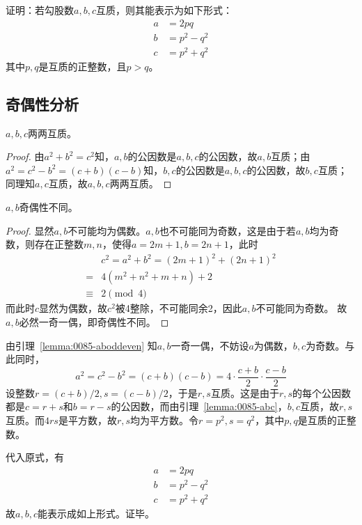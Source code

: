 

证明：若勾股数$a, b, c$互质，则其能表示为如下形式：
\begin{align*}
  a &= 2pq \\
  b &= p^2 - q^2 \\
  c &= p^2 + q^2
\end{align*}
其中$p, q$是互质的正整数，且$p > q$。

\subsection{奇偶性分析}

\begin{lemma} \label{lemma:0085-abc}
  $a, b, c$两两互质。
\end{lemma}

\begin{proof}
  由$a^2 + b^2 = c^2$知，$a, b$的公因数是$a, b, c$的公因数，故$a, b$互质；由$a^2 = c^2 - b^2 = (c + b)(c - b)$知，$b, c$的公因数是$a, b, c$的公因数，故$b, c$互质；同理知$a, c$互质，故$a, b, c$两两互质。
\end{proof}

\begin{lemma} \label{lemma:0085-aboddeven}
  $a, b$奇偶性不同。
\end{lemma}

\begin{proof}
  显然$a, b$不可能均为偶数。$a, b$也不可能同为奇数，这是由于若$a, b$均为奇数，则存在正整数$m, n$，使得$a = 2m + 1, b = 2n + 1$，此时
  \begin{align*}
    & c^2 = a^2 + b^2 = (2m + 1)^2 + (2n + 1)^2 \\
    ={}& 4\left(m^2 + n^2 + m + n\right) + 2 \\
    \equiv{}& 2 \pmod 4
  \end{align*}
  而此时$c$显然为偶数，故$c^2$被4整除，不可能同余2，因此$a, b$不可能同为奇数。
  故$a, b$必然一奇一偶，即奇偶性不同。
\end{proof}

由引理~\ref{lemma:0085-aboddeven} 知$a, b$一奇一偶，不妨设$a$为偶数，$b, c$为奇数。与此同时，
\[ a^2 = c^2 - b^2 = (c + b)(c - b) = 4\cdot\frac{c + b}2\cdot\frac{c - b}2 \]
设整数$r = (c + b)/2, s = (c - b)/2$，于是$r, s$互质。这是由于$r, s$的每个公因数都是$c = r + s$和$b = r - s$的公因数，而由引理~\ref{lemma:0085-abc}，$b, c$互质，故$r, s$互质。而$4rs$是平方数，故$r, s$均为平方数。令$r = p^2, s = q^2$，其中$p, q$是互质的正整数。

代入原式，有
\begin{align*}
  a &= 2pq \\
  b &= p^2 - q^2 \\
  c &= p^2 + q^2
\end{align*}
故$a, b, c$能表示成如上形式。证毕。
